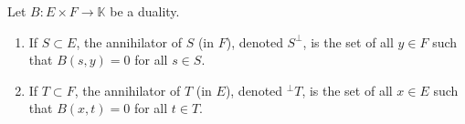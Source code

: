 Let $B: E \times F \to \mathbb{K}$ be a duality.
\begin{enumerate}
\item[(i)] If $S \subset E$, the annihilator of $S$ (in $F$), denoted $S^\perp$, is the set of all $y \in F$ such that $B(s, y) = 0$ for all $s \in S$.
\item[(ii)] If $T \subset F$, the annihilator of $T$ (in $E$), denoted $^\perp T$, is the set of all $x \in E$ such that $B(x, t) = 0$ for all $t \in T$.
\end{enumerate}
